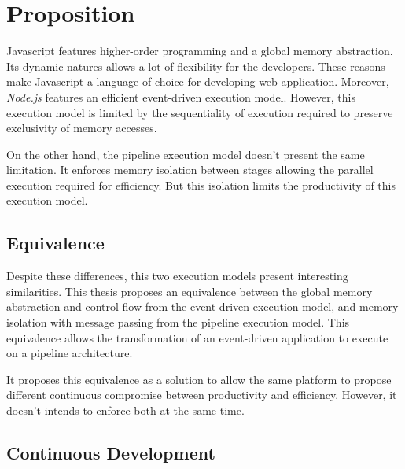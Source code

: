 \section{Proposition} \label{chapter4:proposition}

Javascript features higher-order programming and a global memory abstraction.
Its dynamic natures allows a lot of flexibility for the developers.
These reasons make Javascript a language of choice for developing web application.
Moreover, \textit{Node.js} features an efficient event-driven execution model.
However, this execution model is limited by the sequentiality of execution required to preserve exclusivity of memory accesses.

On the other hand, the pipeline execution model doesn't present the same limitation.
It enforces memory isolation between stages allowing the parallel execution required for efficiency.
But this isolation limits the productivity of this execution model.

\subsection{Equivalence}

Despite these differences, this two execution models present interesting similarities.
This thesis proposes an equivalence between the global memory abstraction and control flow from the event-driven execution model, and memory isolation with message passing from the pipeline execution model.
This equivalence allows the transformation of an event-driven application to execute on a pipeline architecture.

It proposes this equivalence as a solution to allow the same platform to propose different continuous compromise between productivity and efficiency.
However, it doesn't intends to enforce both at the same time.


\subsection{Continuous Development}



